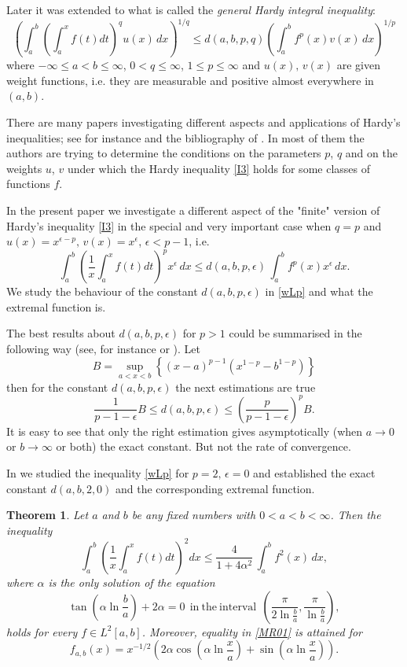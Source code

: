 \documentclass{amsart}
\newtheorem{theorem}{Theorem}[section]
\theoremstyle{definition}
\theoremstyle{remark}
\numberwithin{equation}{section}
\begin{document}
Later it was extended to what is called the {\em general Hardy integral inequality}: 
\begin{equation}\label{I3}
\left(\int_a^b\left(\int_a^xf(t)dt\right)^q u(x)\,dx\right)^{1/q} \leq
d(a,b,p,q)\left(\int_a^b f^p(x)v(x)\,dx \right)^{1/p}
\end{equation}
where $-\infty\le a<b\le\infty$, $0<q\le\infty$, $1\le p\le\infty$ and $u(x),\,v(x)$ are given weight functions,
i.e. they are measurable and positive almost everywhere in $(a,b)$.

There are many papers investigating different aspects and applications of Hardy's inequalities;  
see for instance %
\cite{KP2003} and the bibliography of \cite{KMP2007}. In most of them
the authors are trying to determine the conditions on the parameters $p$, $q$ and on the weights $u$, $v$ under which the Hardy inequality \eqref{I3} holds for some classes of functions $f$.

In the present paper we investigate a different aspect of the "finite" version of Hardy's inequality  \eqref{I3}
in the special and very important case when $q=p$ and $u(x)=x^{\epsilon-p},\,v(x)=x^\epsilon$, $\epsilon<p-1$, i.e.
 \begin{equation}\label{wLp}
\int_a^b\left(\frac{1}{x}\int_a^xf(t)dt\right)^px^\epsilon\,dx\leq
d(a,b,p,\epsilon)\,\int_a^b f^p(x)x^\epsilon\, dx.
\end{equation}
We study the behaviour of the constant $d(a,b,p,\epsilon)$ in \eqref{wLp} and what the extremal function is.

The best results about $d(a,b,p,\epsilon)$ for $p>1$ could be summarised in the following way
(see, for instance \cite{KMP2007} or \cite{KP2003}).
Let
\[
B=\sup_{a<x<b} \left\{(x-a)^{p-1}\left(x^{1-p}-b^{1-p} \right)\right\}
\]
then for the constant $d(a,b,p,\epsilon)$ the next estimations are true
\[
\frac{1}{p-1-\epsilon}B\le d(a,b,p,\epsilon) \le \left(\frac{p}{p-1-\epsilon} \right)^p B.
\]
It is easy to see that only the right estimation gives asymptotically (when $a\rightarrow 0$ or $b\rightarrow \infty$ or both) the exact constant. But not the rate of convergence.

In \cite{DGM} we studied the inequality \eqref{wLp} for $p=2, \,\epsilon=0$ and established the exact constant $d(a,b,2,0)$ and the corresponding extremal function.

\begin{theorem}\cite{DGM}\label{th01}
Let  $a$ and $b$ be any fixed numbers with $0<a<b<\infty$. Then the inequality
\begin{equation}\label{MR01}
\int_a^b\left(\frac{1}{x}\int_a^xf(t)dt\right)^2 dx\leq
\frac{4}{1+4\alpha^2}\,\int_a^bf^2(x)\, dx,
\end{equation}
where $\alpha$ is the only solution of the equation
$$
\tan\left(\alpha\ln\frac{b}{a} \right)+2\alpha=0\ \ \mathrm{in\ the\ interval}\ \ \left(\frac{\pi}{2\ln\frac{b}{a}},\frac{\pi}{\ln\frac{b}{a}} \right),
$$
holds for every $f \in L^2[a,b]$.
Moreover, equality in \eqref{MR01} is attained for 
\[
f_{a,b}(x)=x^{-1/2}\left(2\alpha\cos\left(\alpha\ln \frac{x}{a}\right)+\sin\left(\alpha\ln  \frac{x}{a}\right) \right).
\]
\end{theorem}
\end{document}

